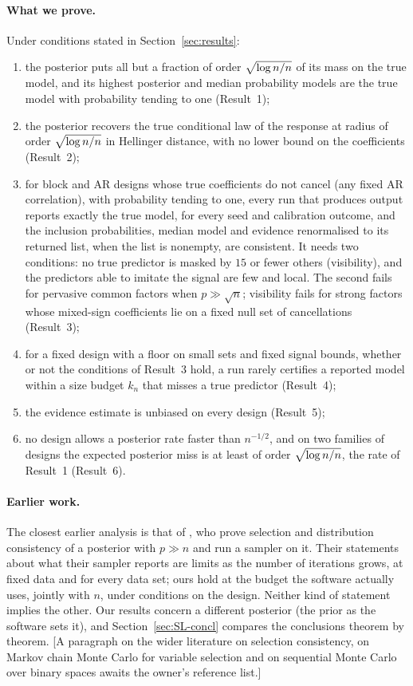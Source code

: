 \paragraph{What we prove.} Under conditions stated in Section~\ref{sec:results}:
\begin{enumerate}[leftmargin=1.6em,itemsep=1pt]
  \item the posterior puts all but a fraction of order $\sqrt{\log n/n}$ of its mass on the true model, and its highest posterior and
    median probability models are the true model with probability tending to one (Result~1);
  \item the posterior recovers the true conditional law of the response at radius of order $\sqrt{\log n/n}$ in Hellinger distance,
    with no lower bound on the coefficients (Result~2);
  \item for block and AR designs whose true coefficients do not cancel (any fixed AR correlation), with probability tending to one, every run that produces output reports
    exactly the true model, for every seed and calibration outcome, and the inclusion probabilities, median model and
    evidence renormalised to its returned list, when the list is nonempty, are consistent. It needs two conditions: no true predictor is masked by
    $15$ or fewer others (visibility), and the predictors able to imitate the signal are few and local. The second fails
    for pervasive common factors when $p\gg\sqrt n$; visibility fails for strong factors whose mixed-sign coefficients lie
    on a fixed null set of cancellations (Result~3);
  \item for a fixed design with a floor on small sets and fixed signal bounds, whether or not the conditions of Result~3
    hold, a run rarely certifies a reported model within a size budget $k_n$ that misses a true predictor (Result~4);
  \item the evidence estimate is unbiased on every design (Result~5);
  \item no design allows a posterior rate faster than $n^{-1/2}$, and on two families of designs the expected posterior
    miss is at least of order $\sqrt{\log n/n}$, the rate of Result~1 (Result~6).
\end{enumerate}

\paragraph{Earlier work.} The closest earlier analysis is that of \citet{SongLiang2015}, who prove selection and
distribution consistency of a posterior with $p\gg n$ and run a sampler on it. Their statements about what their
sampler reports are limits as the number of iterations grows, at fixed data and for every data set; ours hold at the
budget the software actually uses, jointly with $n$, under conditions on the design. Neither kind of statement implies
the other. Our results concern a different posterior (the prior as the software sets it), and Section~\ref{sec:SL-concl}
compares the conclusions theorem by theorem. [A paragraph on the wider literature on selection consistency, on Markov
chain Monte Carlo for variable selection and on sequential Monte Carlo over binary spaces awaits the owner's reference
list.]

